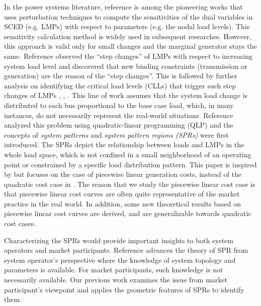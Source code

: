 \documentclass[letterpaper, 11pt]{article}
\theoremstyle{plain}
\theoremstyle{definition}
\begin{document}
In the power systems literature, reference \cite{Conejo2005} is among the pioneering works that uses perturbation techniques to compute the sensitivities of the dual variables in SCED (e.g. LMPs) with respect to parameters (e.g. the nodal load levels).
This sensitivity calculation method is widely used in subsequent researches. However, this approach is valid only for small changes and the marginal generator stays the same. Reference \cite{Li2007} observed the ``step changes'' of LMPs with respect to increasing system load level and discovered that new binding constraints (transmission or generation) are the reason of the ``step changes''.
This is followed by further analysis on identifying the critical load levels (CLLs) that trigger such step changes of LMPs \cite{Li2009}, \cite{Bo2009}, \cite{Bo2011}. 
This line of work assumes that the system load change is distributed to each bus proportional to the base case load, which, in many instances, do not necessarily represent the real-world situations. 
Reference \cite{Zhou2011} analyzed this problem using quadratic-linear programming (QLP) and the concepts of \emph{system patterns} and \emph{system pattern regions (SPRs)} were first introduced. The SPRs depict the relationship between loads and LMPs in the whole load space, which is not confined in a small neighborhood of an operating point or constrained by a specific load distribution pattern. 
This paper is inspired by \cite{Zhou2011} but focuses on the case of piecewise linear generation costs, instead of the quadratic cost case in \cite{Zhou2011}.
The reason that we study the piecewise linear cost case is that piecewise linear cost curves are often quite representative of the market practice in the real world. In addition, some new theoretical results based on piecewise linear cost curves are derived, and are generalizable towards quadratic cost cases.









Characterizing the SPRs would provide important insights to both system operators and market participants. Reference \cite{Ji} advances the theory of SPR from system operator's perspective where the knowledge of system topology and parameters is available. For market participants, such knowledge is not necessarily available. Our previous work \cite{Geng2015} examines the issue from market participant's viewpoint and applies the geometric features of SPRs to identify them. 
\end{document}
